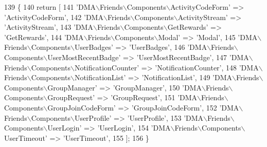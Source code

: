 \begin{DoxyCode}
139     \{
140         \textcolor{keywordflow}{return} [
141             \textcolor{stringliteral}{'DMA\(\backslash\)Friends\(\backslash\)Components\(\backslash\)ActivityCodeForm'}           => \textcolor{stringliteral}{'ActivityCodeForm'},
142             \textcolor{stringliteral}{'DMA\(\backslash\)Friends\(\backslash\)Components\(\backslash\)ActivityStream'}             => \textcolor{stringliteral}{'ActivityStream'},
143             \textcolor{stringliteral}{'DMA\(\backslash\)Friends\(\backslash\)Components\(\backslash\)GetRewards'}                 => \textcolor{stringliteral}{'GetRewards'},
144             \textcolor{stringliteral}{'DMA\(\backslash\)Friends\(\backslash\)Components\(\backslash\)Modal'}                      => \textcolor{stringliteral}{'Modal'},
145             \textcolor{stringliteral}{'DMA\(\backslash\)Friends\(\backslash\)Components\(\backslash\)UserBadges'}                 => \textcolor{stringliteral}{'UserBadges'},
146             \textcolor{stringliteral}{'DMA\(\backslash\)Friends\(\backslash\)Components\(\backslash\)UserMostRecentBadge'}        => \textcolor{stringliteral}{'UserMostRecentBadge'},
147             \textcolor{stringliteral}{'DMA\(\backslash\)Friends\(\backslash\)Components\(\backslash\)NotificationCounter'}        => \textcolor{stringliteral}{'NotificationCounter'},
148             \textcolor{stringliteral}{'DMA\(\backslash\)Friends\(\backslash\)Components\(\backslash\)NotificationList'}           => \textcolor{stringliteral}{'NotificationList'},
149             \textcolor{stringliteral}{'DMA\(\backslash\)Friends\(\backslash\)Components\(\backslash\)GroupManager'}               => \textcolor{stringliteral}{'GroupManager'},               
150             \textcolor{stringliteral}{'DMA\(\backslash\)Friends\(\backslash\)Components\(\backslash\)GroupRequest'}               => \textcolor{stringliteral}{'GroupRequest'},
151             \textcolor{stringliteral}{'DMA\(\backslash\)Friends\(\backslash\)Components\(\backslash\)GroupJoinCodeForm'}          => \textcolor{stringliteral}{'GroupJoinCodeForm'},
152             \textcolor{stringliteral}{'DMA\(\backslash\)Friends\(\backslash\)Components\(\backslash\)UserProfile'}                => \textcolor{stringliteral}{'UserProfile'},
153             \textcolor{stringliteral}{'DMA\(\backslash\)Friends\(\backslash\)Components\(\backslash\)UserLogin'}                  => \textcolor{stringliteral}{'UserLogin'},
154             \textcolor{stringliteral}{'DMA\(\backslash\)Friends\(\backslash\)Components\(\backslash\)UserTimeout'}                => \textcolor{stringliteral}{'UserTimeout'},                  
155         ];
156     \}
\end{DoxyCode}
\hypertarget{classDMA_1_1Friends_1_1Plugin_a900bf22951ffe9e109d1c14afdd261d5}{}
